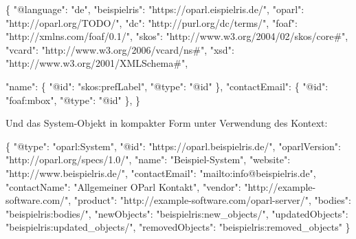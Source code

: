 \documentclass[,a4paper]{article}
\newenvironment{Shaded}{}{}
\newcommand{\DataTypeTok}[1]{\textcolor[rgb]{0.56,0.13,0.00}{{#1}}}
\newcommand{\StringTok}[1]{\textcolor[rgb]{0.25,0.44,0.63}{{#1}}}
\newcommand{\FunctionTok}[1]{\textcolor[rgb]{0.02,0.16,0.49}{{#1}}}
\begin{document}
\begin{Shaded}
\begin{Highlighting}[]
\FunctionTok{\{}
    \DataTypeTok{"@language"}\FunctionTok{:} \StringTok{"de"}\FunctionTok{,}
    \DataTypeTok{"beispielris"}\FunctionTok{:} \StringTok{"https://oparl.eispielris.de/"}\FunctionTok{,}
    \DataTypeTok{"oparl"}\FunctionTok{:} \StringTok{"http://oparl.org/TODO/"}\FunctionTok{,}
    \DataTypeTok{"dc"}\FunctionTok{:} \StringTok{"http://purl.org/dc/terms/"}\FunctionTok{,}
    \DataTypeTok{"foaf"}\FunctionTok{:} \StringTok{"http://xmlns.com/foaf/0.1/"}\FunctionTok{,}
    \DataTypeTok{"skos"}\FunctionTok{:} \StringTok{"http://www.w3.org/2004/02/skos/core#"}\FunctionTok{,}
    \DataTypeTok{"vcard"}\FunctionTok{:} \StringTok{"http://www.w3.org/2006/vcard/ns#"}\FunctionTok{,}
    \DataTypeTok{"xsd"}\FunctionTok{:} \StringTok{"http://www.w3.org/2001/XMLSchema#"}\FunctionTok{,}

    \DataTypeTok{"name"}\FunctionTok{:} \FunctionTok{\{}
        \DataTypeTok{"@id"}\FunctionTok{:} \StringTok{"skos:prefLabel"}\FunctionTok{,}
        \DataTypeTok{"@type"}\FunctionTok{:} \StringTok{"@id"}
    \FunctionTok{\},}
    \DataTypeTok{"contactEmail"}\FunctionTok{:} \FunctionTok{\{}
        \DataTypeTok{"@id"}\FunctionTok{:} \StringTok{"foaf:mbox"}\FunctionTok{,}
        \DataTypeTok{"@type"}\FunctionTok{:} \StringTok{"@id"}
    \FunctionTok{\},}
\FunctionTok{\}}
\end{Highlighting}
\end{Shaded}

Und das System-Objekt in kompakter Form unter Verwendung des Kontext:

\begin{Shaded}
\begin{Highlighting}[]
\FunctionTok{\{}
    \DataTypeTok{"@type"}\FunctionTok{:} \StringTok{"oparl:System"}\FunctionTok{,}
    \DataTypeTok{"@id"}\FunctionTok{:} \StringTok{"https://oparl.beispielris.de/"}\FunctionTok{,}
    \DataTypeTok{"oparlVersion"}\FunctionTok{:} \StringTok{"http://oparl.org/specs/1.0/"}\FunctionTok{,}
    \DataTypeTok{"name"}\FunctionTok{:} \StringTok{"Beispiel-System"}\FunctionTok{,}
    \DataTypeTok{"website"}\FunctionTok{:} \StringTok{"http://www.beispielris.de/"}\FunctionTok{,}
    \DataTypeTok{"contactEmail"}\FunctionTok{:} \StringTok{"mailto:info@beispielris.de"}\FunctionTok{,}
    \DataTypeTok{"contactName"}\FunctionTok{:} \StringTok{"Allgemeiner OParl Kontakt"}\FunctionTok{,}
    \DataTypeTok{"vendor"}\FunctionTok{:} \StringTok{"http://example-software.com/"}\FunctionTok{,}
    \DataTypeTok{"product"}\FunctionTok{:} \StringTok{"http://example-software.com/oparl-server/"}\FunctionTok{,}
    \DataTypeTok{"bodies"}\FunctionTok{:} \StringTok{"beispielris:bodies/"}\FunctionTok{,}
    \DataTypeTok{"newObjects"}\FunctionTok{:} \StringTok{"beispielris:new_objects/"}\FunctionTok{,}
    \DataTypeTok{"updatedObjects"}\FunctionTok{:} \StringTok{"beispielris:updated_objects/"}\FunctionTok{,}
    \DataTypeTok{"removedObjects"}\FunctionTok{:} \StringTok{"beispielris:removed_objects"}
\FunctionTok{\}}
\end{Highlighting}
\end{Shaded}
\end{document}
